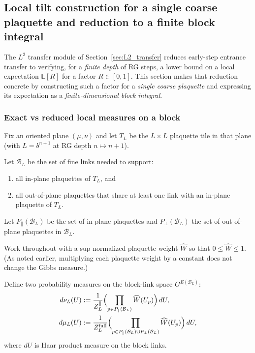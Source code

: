 \subsection{Local tilt construction for a single coarse plaquette and reduction to a finite block integral}\label{sec:local_tilt}

The $L^2$ transfer module of Section~\ref{sec:L2_transfer} reduces early-step entrance transfer to verifying,
for a \emph{finite depth} of RG steps, a lower bound on a local expectation
$\mathbb E[R]$ for a factor $R\in[0,1]$.
This section makes that reduction concrete by constructing such a factor for a
\emph{single coarse plaquette} and expressing its expectation as a \emph{finite-dimensional block integral}.

\subsubsection{Exact vs reduced local measures on a block}

Fix an oriented plane $(\mu,\nu)$ and let $T_L$ be the $L\times L$ plaquette tile in that plane (with $L=b^{n+1}$ at RG depth $n\mapsto n+1$).

\begin{definition}\label{def:block_BL}
Let $\mathcal B_L$ be the set of fine links needed to support:
\begin{enumerate}[label=(\roman*)]
\item all in-plane plaquettes of $T_L$, and
\item all out-of-plane plaquettes that share at least one link with an in-plane plaquette of $T_L$.
\end{enumerate}
Let $P_{\parallel}(\mathcal B_L)$ be the set of in-plane plaquettes and $P_{\perp}(\mathcal B_L)$ the set of out-of-plane plaquettes in $\mathcal B_L$.
\end{definition}

Work throughout with a sup-normalized plaquette weight $\widehat W$ so that $0\le \widehat W\le 1$.
(As noted earlier, multiplying each plaquette weight by a constant does not change the Gibbs measure.)

Define two probability measures on the block-link space $G^{E(\mathcal B_L)}$:
\begin{align}
d\nu_L(U) &:= \frac{1}{Z_L^{\parallel}}\Bigl(\prod_{p\in P_{\parallel}(\mathcal B_L)} \widehat W(U_p)\Bigr)\,dU,
\\
d\mu_L(U) &:= \frac{1}{Z_L^{\mathrm{full}}}\Bigl(\prod_{p\in P_{\parallel}(\mathcal B_L)\cup P_{\perp}(\mathcal B_L)} \widehat W(U_p)\Bigr)\,dU,
\end{align}
where $dU$ is Haar product measure on the block links.

